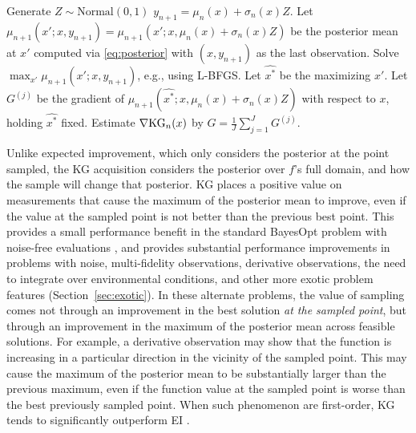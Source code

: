 \documentclass{article}
\begin{document}
\begin{algorithmic}
\begin{algorithm}
\STATE Generate $Z\sim\mathrm{Normal}(0,1)$
\STATE $y_{n+1} = \mu_n(x) + \sigma_n(x) Z$.
\STATE Let $\mu_{n+1}(x';x,y_{n+1})=\mu_{n+1}(x';x,\mu_n(x)+\sigma_n(x)Z)$
be the posterior mean at $x'$ computed via \eqref{eq:posterior} with $(x,y_{n+1})$ as the last observation. 
\STATE Solve $\max_{x'} \mu_{n+1}(x';x,y_{n+1})$, e.g., using L-BFGS. Let $\widehat{x^*}$ be the maximizing $x'$.
\STATE Let $G^{(j)}$ be the gradient of $\mu_{n+1}(\widehat{x^*};x,\mu_n(x)+\sigma_n(x)Z)$ with respect to $x$, holding $\widehat{x^*}$ fixed.
\ENDFOR
\STATE Estimate $\nabla\mathrm{KG}_n(x)$ by $G = \frac1J \sum_{j=1}^J G^{(j)}$.
\caption{
Simulation of unbiased stochastic gradients $G$ with $E[G] = \nabla \KG_n(x)$.  This stochastic gradient can then be used within stochastic gradient ascent to optimize the KG acquisition function.
\label{alg:grad-KG}
}
\end{algorithm}
\end{algorithmic}





Unlike expected improvement, which only considers the posterior at the point sampled, 
the KG acquisition considers the posterior over $f$'s full domain, and how the sample will change that posterior.
KG places a positive value on measurements that cause the maximum of the posterior mean to improve, even if the value at the sampled point is not better than the previous best point.  This provides a small performance benefit in the standard BayesOpt problem with noise-free evaluations \citep{frazier2009knowledge}, and provides substantial performance improvements in problems with noise, multi-fidelity observations, derivative observations, the need to integrate over environmental conditions, and other more exotic problem features (Section~\ref{sec:exotic}).  In these alternate problems, the value of sampling comes not through an improvement in the best solution {\it at the sampled point}, but through an improvement in the maximum of the posterior mean across feasible solutions.  For example, a derivative observation may show that the function is increasing in a particular direction in the vicinity of the sampled point.  This may cause the maximum of the posterior mean to be substantially larger than the previous maximum, even if the function value at the sampled point is worse than the best previously sampled point.  When such phenomenon are first-order, KG tends to significantly outperform EI \citep{wu2017gradient,poloczek2017multi,wu2016parallel,toscano2018bayesian}.
\end{document}
